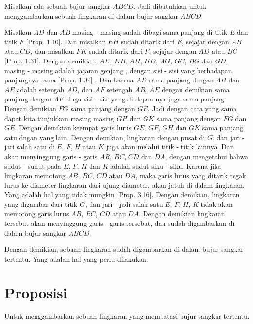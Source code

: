 \documentclass[a4paper]{book}
\begin{document}
Misalkan ada sebuah bujur sangkar $ABCD$. Jadi dibutuhkan untuk menggambarkan
sebuah lingkaran di dalam bujur sangkar $ABCD$.

Misalkan $AD$ dan $AB$ masing - masing sudah dibagi sama panjang di titik $E$ 
dan titik $F$ [Prop. 1.10]. Dan misalkan $EH$ sudah ditarik dari $E$, sejajar 
dengan $AB$ atau $CD$, dan misalkan $FK$ sudah ditarik dari $F$, sejajar dengan 
$AD$ atau $BC$ [Prop. 1.31]. Dengan demikian, $AK$, $KB$, $AH$, $HD$, $AG$, $GC$, 
$BG$ dan $GD$, masing - masing adalah jajaran genjang , dengan sisi - sisi
yang berhadapan panjangnya sama [Prop. 1.34] . Dan karena $AD$ sama panjang 
dengan $AB$ dan $AE$ adalah setengah $AD$, dan $AF$ setengah $AB$, $AE$ dengan 
demikian sama panjang dengan $AF$. Juga sisi - sisi yang di depan nya juga sama
panjang. Dengan demikian $FG$ sama panjang dengan $GE$. Jadi dengan cara yang
sama dapat kita tunjukkan masing masing $GH$ dan $GK$ sama panjang dengan 
$FG$ dan $GE$. Dengan demikian keempat garis lurus $GE$, $GF$, $GH$ dan $GK$ 
sama panjang satu dngan yang lain. Dengan demikian, lingkaran dengan pusat di 
$G$, dan jari - jari salah satu di $E$, $F$, $H$ atau $K$ juga akan melalui
titik - titik lainnya. Dan akan menyinggung garis - garis $AB$, $BC$, $CD$ dan 
$DA$, dengan mengetahui bahwa sudut - sudut pada $E$, $F$, $H$ dan $K$ adalah
sudut siku - siku. Karena jika lingkaran memotong $AB$, $BC$, $CD$ atau $DA$, 
maka garis lurus yang ditarik tegak lurus ke diameter lingkaran dari ujung
diameter, akan jatuh di dalam lingkaran. Yang adalah hal yang tidak mungkin
[Prop. 3.16]. Dengan demikian, lingkaran yang digambar dari titik $G$, dan jari
- jadi  salah satu $E$, $F$, $H$, $K$ tidak akan memotong garis lurus $AB$, $BC$, 
$CD$ atau $DA$. Dengan demikian lingkaran tersebut akan menyinggung garis - garis
tersebut, dan sudah digambarkan di dalam bujur sangkar $ABCD$.

Dengan demikian, sebuah lingkaran sudah digambarkan di dalam bujur sangkar 
tertentu. Yang adalah hal yang perlu dilakukan.

\section*{\centering Proposisi \thesection}
Untuk menggambarkan sebuah lingkaran yang membatasi bujur sangkar tertentu.
\begin{center} 
\end{center}
\end{document}
